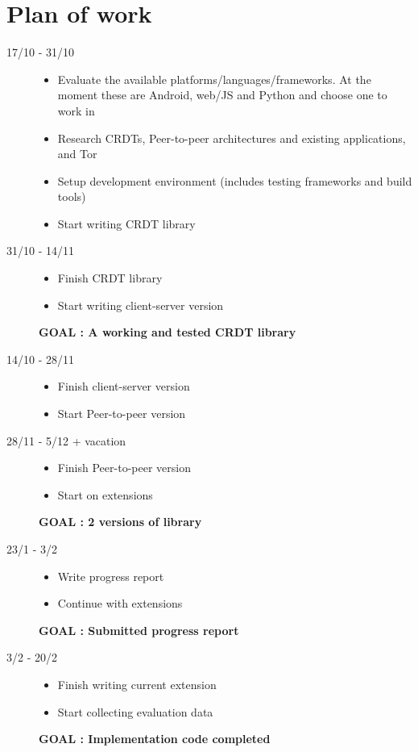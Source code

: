 \documentclass[12pt,a4paper]{article}
\begin{document}
\section*{Plan of work}
\begin{description}
	\item[17/10 - 31/10] \hfill
	\begin{itemize}
		\item Evaluate the available platforms/languages/frameworks. At the moment these are Android, web/JS and Python and choose one to work in
		\item Research CRDTs, Peer-to-peer architectures and existing applications, and Tor
		\item Setup development environment (includes testing frameworks and build tools)
		\item Start writing CRDT library
	\end{itemize}
	
	\item[31/10 - 14/11] \hfill
	\begin{itemize}
		\item Finish CRDT library
		\item Start writing client-server version
	\end{itemize}
	\textbf{GOAL : A working and tested CRDT library}
	
	\item[14/10 - 28/11] \hfill
	\begin{itemize}
		\item Finish client-server version
		\item Start Peer-to-peer version
	\end{itemize}
	
	\item[28/11 - 5/12 + vacation] \hfill
	\begin{itemize}
		\item Finish Peer-to-peer version
		\item Start on extensions
	\end{itemize}
	\textbf{GOAL : 2 versions of library}
	
	\item[23/1 - 3/2] \hfill
	\begin{itemize}
		\item Write progress report
		\item Continue with extensions
	\end{itemize}
	\textbf{GOAL : Submitted progress report}
	
	\item[3/2 - 20/2] \hfill
	\begin{itemize}
		\item Finish writing current extension
		\item Start collecting evaluation data
	\end{itemize}
	\textbf{GOAL : Implementation code completed}
	

\end{description}
\end{document}

